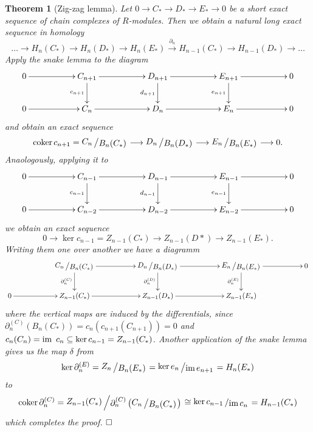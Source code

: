 \documentclass[11pt]{book}
\numberwithin{dummy}{section}
\newtheorem{theorem}{Theorem}[section]
\theoremstyle{nonumberbreak}
\newenvironment{pr}[1][]{\ifthenelse{\equal{#1}{}}{\proof}{\proof[#1]}\rm}{\endproof}
\newcommand{\im}{\mathrm{im} \hspace{1.5pt}}
\newcommand{\cokern}{\mathrm{coker}\hspace{1.5pt}}
\newcommand{\la}{\longrightarrow}
\newcommand{\slant}[2]{{\raisebox{.1em}{$#1$}\left/\raisebox{-.1em}{$#2$}\right.}}
\begin{document}
\begin{spacing}{1.4}
\begin{theorem}[Zig-zag lemma]
Let $0 \la C_* \la D_* \la E_* \la 0$ be a short exact sequence of chain complexes of $R$-modules. Then we obtain a natural long exact sequence in homology
$$\ldots \la H_n(C_*) \la H_n(D_*) \la H_n(E_*) \overset{\partial_n}{\la} H_{n-1}(C_*) \la H_{n-1}(D_*) \la \ldots$$
\begin{pr}
Apply the snake lemma to the diagram
$$
\begin{xy}
\xymatrix{
0 \ar[rr] && C_{n+1} \ar[d]_{c_{n+1}}  \ar[rr] && D_{n+1} \ar[d]_{d_{n+1}} \ar[rr] && E_{n+1} \ar[rr] \ar[d]_{e_{n+1}} && 0 \\
0 \ar[rr] && C_n \ar[rr] && D_n \ar[rr] && E_n \ar[rr] && 0 
}
\end{xy}
$$
and obtain an exact sequence
$$\cokern c_{n+1} = \slant{C_n}{B_n(C_*)} \la \slant{D_n}{B_n(D_*)} \la \slant{E_n}{B_n(E_*)} \la 0.$$
Anaologously, applying it to
$$
\begin{xy}
\xymatrix{
0 \ar[rr] && C_{n-1} \ar[d]_{c_{n-1}}  \ar[rr] && D_{n-1} \ar[d]_{d_{n-1}} \ar[rr] && E_{n-1} \ar[rr] \ar[d]_{e_{n-1}} && 0 \\
0 \ar[rr] && C_{n-2} \ar[rr] && D_{n-2} \ar[rr] && E_{n-2} \ar[rr] && 0 
}
\end{xy}
$$
we obtain an exact sequence
$$0 \la \ker c_{n-1}  = Z_{n-1}(C_*) \la Z_{n-1}(D*) \la Z_{n-1}(E_*).$$
Writing them one over another we have a diagramm
$$
\begin{xy}
\xymatrix{
&& \slant{C_n}{B_n(C_*)} \ar[rr] \ar[d]_{\partial_{n}^{(C)}} && \slant{D_n}{B_n(D_*)} \ar[d]_{\partial_{n}^{(D)}} \ar[rr] && \slant{E_n}{B_n(E_*)} \ar[d]_{\partial_{n}^{(E)}} \ar[rr] && 0 \\
0 \ar[rr] && Z_{n-1}(C_*) \ar[rr] && Z_{n-1}(D_*) \ar[rr] && Z_{n-1}(E_*) && 
}
\end{xy}
$$
where the vertical maps are induced by the differentials, since $\partial_{n}^{(C)}(B_n(C_*)) = c_{n}(c_{n+1}(C_{n+1})) = 0$ and $c_n(C_n) = \im \ c_n \subseteq \ker c_{n-1} = Z_{n-1}(C_*)$.  Another application of the snake lemma gives us the map $\delta$ from 
$$\ker \partial_{n}^{(E)} = \slant{Z_n}{B_n(E_*)} = \slant{ \ker e_n}{\im e_{n+1}} = H_n(E_*)$$
to 
$$\cokern \partial_{n}^{(C)} = \slant{Z_{n-1}(C_*)}{\partial_{n}^{(C)}\left( \slant{C_n}{B_n(C_*)}\right)} \cong \slant{\ker c_{n-1}}{\im c_n} = H_{n-1}(C_*)$$
which completes the proof. $\hfill \Box$

\end{pr}
\end{theorem}



\end{spacing}
\end{document}
